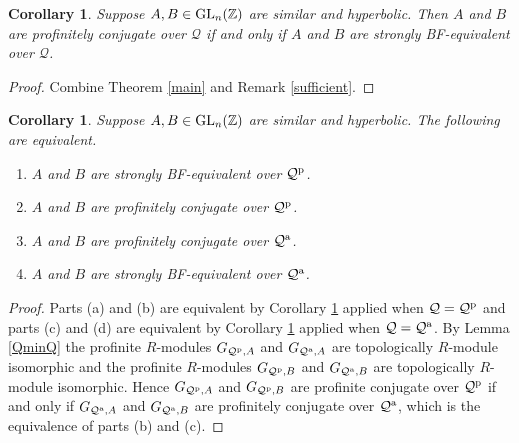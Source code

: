\documentclass{amsart}
\theoremstyle{plain}
\newtheorem{corollary}[theorem]{Corollary}
\theoremstyle{definition}
\theoremstyle{remark}
\begin{document}
\begin{corollary}\label{characterization} Suppose $A,B\in {\rm GL}_n({\mathbb Z})$ are similar and hyperbolic. Then $A$ and $B$ are profinitely conjugate over ${\mathcal Q}$ if and only if $A$ and $B$ are strongly {\rm BF}-equivalent over ${\mathcal Q}$.
\end{corollary}

\begin{proof} Combine Theorem \ref{main} and Remark \ref{sufficient}.
\end{proof}

\begin{corollary}\label{prinall} Suppose $A,B\in {\rm GL}_n({\mathbb Z})$ are similar and hyperbolic. The following are equivalent.
\begin{enumerate}
\item[(a)] $A$ and $B$ are strongly {\rm BF}-equivalent over ${\mathcal Q}^{\rm p}$.
\item[(b)] $A$ and $B$ are profinitely conjugate over ${\mathcal Q}^{\rm p}$.
\item[(c)] $A$ and $B$ are profinitely conjugate over ${\mathcal Q}^{\rm a}$.
\item[(d)] $A$ and $B$ are strongly {\rm BF}-equivalent over ${\mathcal Q}^{\rm a}$.
\end{enumerate}
\end{corollary}

\begin{proof} Parts (a) and (b) are equivalent by Corollary \ref{characterization} applied when ${\mathcal Q} = {\mathcal Q}^{\rm p}$ and parts (c) and (d) are equivalent by Corollary \ref{characterization} applied when ${\mathcal Q} = {\mathcal Q}^{\rm a}$. By Lemma \ref{QminQ} the profinite $R$-modules $G_{ {\mathcal Q}^{\rm p},A}$ and $G_{ {\mathcal Q}^{\rm a},A}$ are topologically $R$-module isomorphic and the profinite $R$-modules $G_{ {\mathcal Q}^{\rm p},B}$ and $G_{ {\mathcal Q}^{\rm a},B}$ are topologically $R$-module isomorphic. Hence $G_{ {\mathcal Q}^{\rm p},A}$ and $G_{ {\mathcal Q}^{\rm p},B}$ are profinite conjugate over ${\mathcal Q}^{\rm p}$ if and only if $G_{ {\mathcal Q}^{\rm a},A}$ and $G_{ {\mathcal Q}^{\rm a},B}$ are profinitely conjugate over ${\mathcal Q}^{\rm a}$, which is the equivalence of parts (b) and (c).
\end{proof}
\end{document}
